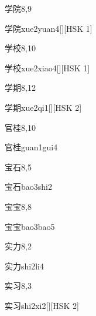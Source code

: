 \begin{entry}{学院}{8,9}
  \begin{phonetics}{学院}{xue2yuan4}[][HSK 1]
  \end{phonetics}
\end{entry}

\begin{entry}{学校}{8,10}
  \begin{phonetics}{学校}{xue2xiao4}[][HSK 1]
  \end{phonetics}
\end{entry}

\begin{entry}{学期}{8,12}
  \begin{phonetics}{学期}{xue2qi1}[][HSK 2]
  \end{phonetics}
\end{entry}

\begin{entry}{官桂}{8,10}
  \begin{phonetics}{官桂}{guan1gui4}
  \end{phonetics}
\end{entry}

\begin{entry}{宝石}{8,5}
  \begin{phonetics}{宝石}{bao3shi2}
  \end{phonetics}
\end{entry}

\begin{entry}{宝宝}{8,8}
  \begin{phonetics}{宝宝}{bao3bao5}
  \end{phonetics}
\end{entry}

\begin{entry}{实力}{8,2}
  \begin{phonetics}{实力}{shi2li4}
  \end{phonetics}
\end{entry}

\begin{entry}{实习}{8,3}
  \begin{phonetics}{实习}{shi2xi2}[][HSK 2]
  \end{phonetics}
\end{entry}

